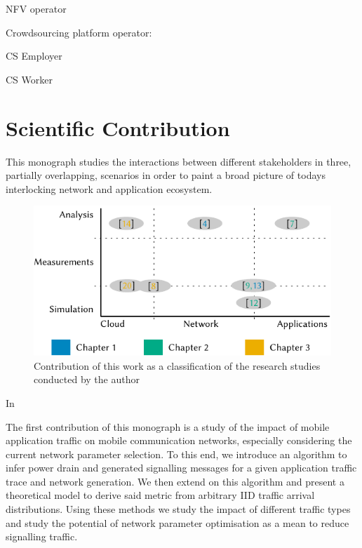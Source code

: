 NFV operator

Crowdsourcing platform operator:

CS Employer

CS Worker

\section{Scientific Contribution}
This monograph studies the interactions between different stakeholders in three, partially overlapping, scenarios in order to paint a broad picture of todays interlocking network and application ecosystem.

\begin{figure}
\centering
\includegraphics{figures/publications}
\caption{Contribution of this work as a classification of the research studies conducted by the author}\label{fig:introduction:publications}
\end{figure}

In 

The first contribution of this monograph is a study of the impact of mobile application traffic on mobile communication networks, especially considering the current network parameter selection.
To this end, we introduce an algorithm to infer power drain and generated signalling messages for a given application traffic trace and network generation.
We then extend on this algorithm and present a theoretical model to derive said metric from arbitrary \gls{IID} traffic arrival distributions.
Using these methods we study the impact of different traffic types and study the potential of network parameter optimisation as a mean to reduce signalling traffic.

